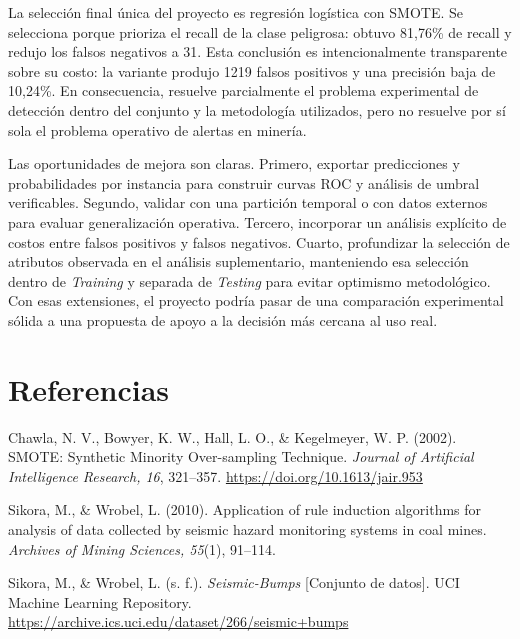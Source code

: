 \documentclass[12pt,a4paper]{article}
\begin{document}
La selección final única del proyecto es regresión logística con SMOTE. Se selecciona porque prioriza el recall de la clase peligrosa: obtuvo 81,76\% de recall y redujo los falsos negativos a 31. Esta conclusión es intencionalmente transparente sobre su costo: la variante produjo 1219 falsos positivos y una precisión baja de 10,24\%. En consecuencia, resuelve parcialmente el problema experimental de detección dentro del conjunto y la metodología utilizados, pero no resuelve por sí sola el problema operativo de alertas en minería.

Las oportunidades de mejora son claras. Primero, exportar predicciones y probabilidades por instancia para construir curvas ROC y análisis de umbral verificables. Segundo, validar con una partición temporal o con datos externos para evaluar generalización operativa. Tercero, incorporar un análisis explícito de costos entre falsos positivos y falsos negativos. Cuarto, profundizar la selección de atributos observada en el análisis suplementario, manteniendo esa selección dentro de \textit{Training} y separada de \textit{Testing} para evitar optimismo metodológico. Con esas extensiones, el proyecto podría pasar de una comparación experimental sólida a una propuesta de apoyo a la decisión más cercana al uso real.

\section{Referencias}
Chawla, N. V., Bowyer, K. W., Hall, L. O., \& Kegelmeyer, W. P. (2002). SMOTE: Synthetic Minority Over-sampling Technique. \textit{Journal of Artificial Intelligence Research, 16}, 321--357. \url{https://doi.org/10.1613/jair.953}

Sikora, M., \& Wrobel, L. (2010). Application of rule induction algorithms for analysis of data collected by seismic hazard monitoring systems in coal mines. \textit{Archives of Mining Sciences, 55}(1), 91--114.

Sikora, M., \& Wrobel, L. (s. f.). \textit{Seismic-Bumps} [Conjunto de datos]. UCI Machine Learning Repository. \url{https://archive.ics.uci.edu/dataset/266/seismic+bumps}
\end{document}
